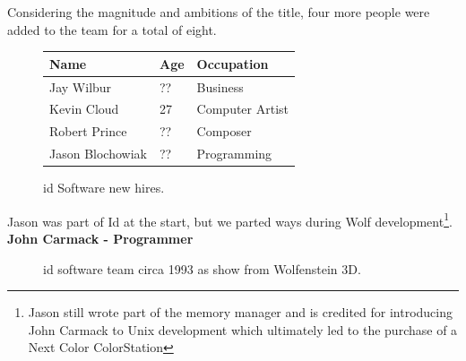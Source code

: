 \documentclass[book.tex]{subfiles}
\begin{document}
Considering the magnitude and ambitions of the title, four more people were added to the team for a total of eight.\\

 \begin{figure}[H]
\centering  
\begin{tabularx}{\textwidth}{ X  X  X  }
  \toprule
  \textbf{Name} &  \textbf{Age} & \textbf{Occupation} \\
  \toprule 
   Jay Wilbur & ?? &  Business\\
   Kevin Cloud & 27 &  Computer Artist\\
   Robert Prince & ?? &  Composer\\
   Jason Blochowiak & ?? &   Programming\\
     \toprule
\end{tabularx}
\caption{id Software new hires.}\label{fig:Id Software hires}
\end{figure}

\begin{fancyquotes}
Jason was part of Id at the start, but we parted ways during Wolf development\footnote{Jason still wrote part of the memory manager and is credited for introducing John Carmack to Unix development which ultimately led to the purchase of a Next Color ColorStation}.
 \bigskip \\
\textbf{John Carmack - Programmer}
 \end{fancyquotes}
 
\begin{figure}[H]
\centering
\caption{id software team circa 1993 as show from Wolfenstein 3D.}
\label{fig:id_team_1993}
\end{figure}
 
\end{document}
